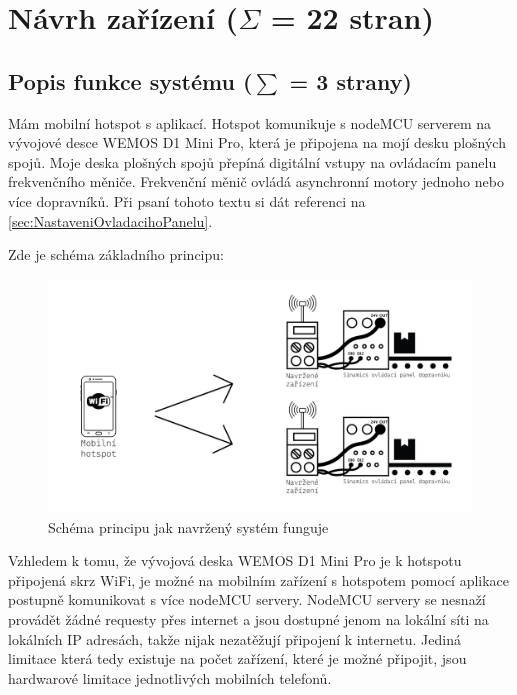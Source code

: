 \chapter{Návrh zařízení ($\Sigma$ = 22 stran)}
\section{Popis funkce systému ($\sum$ = 3 strany)}\label{sec:PopisFunkceSystemu}

Mám mobilní hotspot s aplikací. Hotspot komunikuje s nodeMCU serverem na vývojové desce WEMOS D1 Mini Pro, která je připojena na mojí desku plošných spojů. Moje deska plošných spojů přepíná digitální vstupy na ovládacím panelu frekvenčního měniče. Frekvenční měnič ovládá asynchronní motory jednoho nebo více dopravníků. Při psaní tohoto textu si dát referenci na \ref{sec:NastaveniOvladacihoPanelu}.

Zde je schéma základního principu:

\begin{figure}[H]
    \centering
    \includegraphics[width=1\linewidth]{images/FunkcniSchema_DvaOvladace.png}
    \caption{Schéma principu jak navržený systém funguje}
    \label{fig:PrincipFunkceZarizeni}
\end{figure}

Vzhledem k tomu, že vývojová deska WEMOS D1 Mini Pro je k hotspotu připojená skrz WiFi, je možné na mobilním zařízení s hotspotem pomocí aplikace postupně komunikovat s více nodeMCU servery. NodeMCU servery se nesnaží provádět žádné requesty přes internet a jsou dostupné jenom na lokální síti na lokálních IP adresách, takže nijak nezatěžují připojení k internetu. Jediná limitace která tedy existuje na počet zařízení, které je možné připojit, jsou hardwarové limitace jednotlivých mobilních telefonů.

